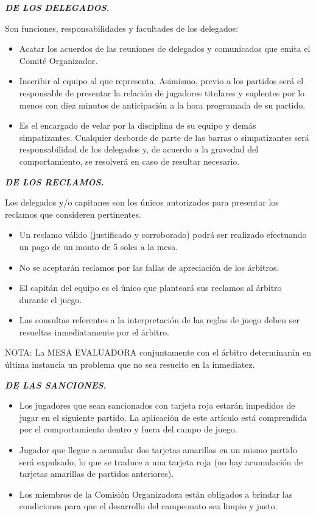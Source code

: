 \documentclass[11pt,a4paper]{article}
\newcommand{\titulo}[1]{\par\medskip\textbf{\textit{#1}}\par}
\begin{document}
\titulo{DE LOS DELEGADOS.}
Son funciones, responsabilidades y facultades de los delegados:
\begin{itemize}
	\item Acatar los acuerdos de las reuniones de delegados y comunicados que emita el Comité Organizador.
	\item Inscribir al equipo al que representa. Asimismo, previo a los partidos será el responsable de presentar la relación de jugadores titulares y suplentes por lo menos con diez minutos de anticipación a la hora programada de su partido.
	\item Es el encargado de velar por la disciplina de su equipo y demás simpatizantes. Cualquier desborde de parte de las barras o simpatizantes será responsabilidad de los delegados y, de acuerdo a la gravedad del comportamiento, se resolverá en caso de resultar necesario.
\end{itemize}

\titulo{DE LOS RECLAMOS.}
Los delegados y/o capitanes son los únicos autorizados para presentar los reclamos que consideren pertinentes.
\begin{itemize}
	\item Un reclamo válido (justificado y corroborado) podrá ser realizado efectuando un pago de un monto de 5 soles a la mesa.
	\item No se aceptarán reclamos por las fallas de apreciación de los árbitros.
	\item El capitán del equipo es el único que planteará sus reclamos al árbitro durante el juego.
	\item Las consultas referentes a la interpretación de las reglas de juego deben ser resueltas inmediatamente por el árbitro.
\end{itemize}
NOTA: La MESA EVALUADORA conjuntamente con el árbitro determinarán en última instancia un problema que no sea resuelto en la inmediatez.

\titulo{DE LAS SANCIONES.}
\begin{itemize}
	\item Los jugadores que sean sancionados con tarjeta roja estarán impedidos de jugar en el siguiente partido. La aplicación de este artículo está comprendida por el comportamiento dentro y fuera del campo de juego.
	\item Jugador que llegue a acumular dos tarjetas amarillas en un mismo partido será expulsado, lo que se traduce a una tarjeta roja (no hay acumulación de tarjetas amarillas de partidos anteriores).
	\item Los miembros de la Comisión Organizadora están obligados a brindar las condiciones para que el desarrollo del campeonato sea limpio y justo.
\end{itemize}
\end{document}
